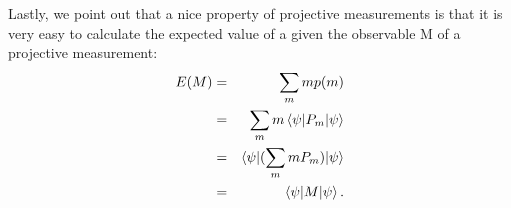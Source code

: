 

Lastly, we point out that a nice property of projective measurements is that it is very easy to calculate the expected value of a given the observable M of a projective measurement:
\begin{eqnarray}
E(M)&=&\sum_m mp(m)\\
&=&\sum_m m \braket{\psi|P_m|\psi}\\
&=&\braket{\psi|(\sum_m mP_m)|\psi}\\
&=&\braket{\psi|M|\psi}.
\end{eqnarray}

